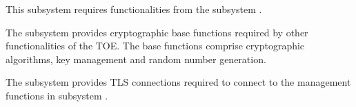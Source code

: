 
This subsystem requires functionalities from the subsystem
.



The subsystem  provides cryptographic base functions
required by other functionalities of the TOE. The base functions comprise
cryptographic algorithms, key management and random number generation.





The subsystem  provides TLS connections required to connect
to the management functions in subsystem .






